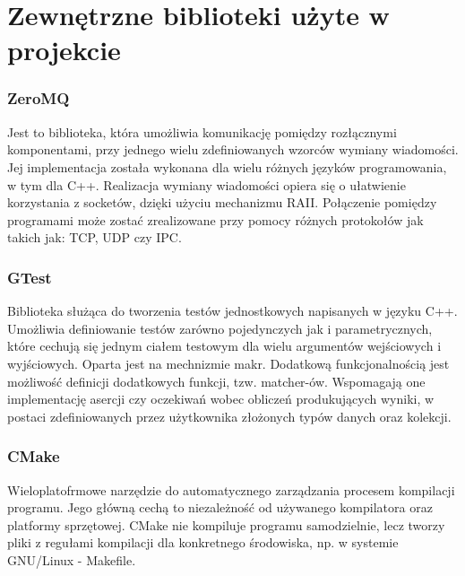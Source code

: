 \chapter{Zewnętrzne biblioteki użyte w projekcie}
\subsection{ZeroMQ}
Jest to biblioteka, która umożliwia komunikację pomiędzy rozłącznymi komponentami, przy jednego wielu zdefiniowanych wzorców wymiany
wiadomości. Jej implementacja została wykonana dla wielu różnych języków programowania, w tym dla C++.
Realizacja wymiany wiadomości opiera się o ułatwienie korzystania z socketów, dzięki użyciu mechanizmu RAII.
Połączenie pomiędzy programami może zostać zrealizowane przy pomocy różnych protokołów jak takich jak: TCP, UDP czy IPC.

\subsection{GTest}
Biblioteka służąca do tworzenia testów jednostkowych napisanych w języku C++. Umożliwia definiowanie testów zarówno
pojedynczych jak i parametrycznych, które cechują się jednym ciałem testowym dla wielu argumentów wejściowych i wyjściowych.
Oparta jest na mechnizmie makr. Dodatkową funkcjonalnością jest możliwość definicji dodatkowych funkcji, tzw. matcher-ów.
Wspomagają one implementację asercji czy oczekiwań wobec obliczeń produkujących wyniki, w postaci zdefiniowanych przez użytkownika
złożonych typów danych oraz kolekcji.

\newpage
\subsection{CMake}
Wieloplatofrmowe narzędzie do automatycznego zarządzania procesem kompilacji programu.
Jego główną cechą to niezależność od używanego kompilatora oraz platformy sprzętowej. CMake nie kompiluje programu
samodzielnie, lecz tworzy pliki z regułami kompilacji dla konkretnego środowiska, np. w systemie GNU/Linux - Makefile\cite{CMAKE}.

